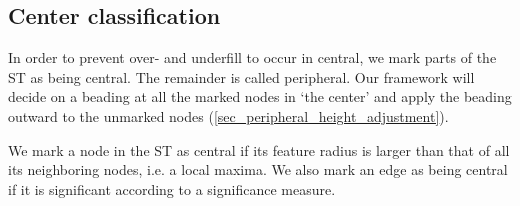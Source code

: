 %









\subsection{Center classification}\label{sec_center_classification}
In order to prevent over- and underfill to occur in central, we mark parts of the ST as being central.
The remainder is called peripheral.
Our framework will decide on a beading at all the marked nodes in `the center' and apply the beading outward to the unmarked nodes (\cref{sec_peripheral_height_adjustment}).

We mark a node in the ST as central if its feature radius is larger than that of all its neighboring nodes, i.e. a local maxima.
We also mark an edge as being central if it is significant according to a significance measure.

